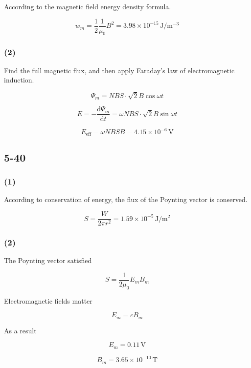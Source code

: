 \documentclass[a4paper,11pt]{amsart}
\theoremstyle{definition}
\begin{document}
	According to the magnetic field energy density formula.
	
	$$
	w_m=\frac{1}{2}\frac{1}{\mu _0}B^2=3.98\times 10^{-15}\,\mathrm{J}/\mathrm{m}^{-3}
	$$
	
	\subsubsection*{(2)}
	
	Find the full magnetic flux, and then apply Faraday's law of electromagnetic induction.
	
	$$
	\varPsi _m=NBS\cdot \sqrt{2}B\cos \omega t
	$$
	
	$$
	E=-\frac{\mathrm{d}\varPsi _m}{\mathrm{d}t}=\omega NBS\cdot \sqrt{2}B\sin \omega t
	$$
	
	$$
	E_{\mathrm{eff}}=\omega NBSB=4.15\times 10^{-6}\,\mathrm{V}
	$$
	
	\subsection*{5-40}
	
	\subsubsection*{(1)}
	
	According to conservation of energy, the flux of the Poynting vector is conserved.
	
	$$
	\bar{S}=\frac{W}{2\pi r^2}=1.59\times 10^{-5}\,\mathrm{J}/\mathrm{m}^2
	$$
	
	\subsubsection*{(2)}
	
	The Poynting vector satisfied
	
	$$
	\bar{S}=\frac{1}{2\mu _0}E_mB_m
	$$
	
	Electromagnetic fields matter
	
	$$
	E_m=cB_m
	$$
	
	As a result
	
	$$
	E_m=0.11\,\mathrm{V}
	$$
	
	$$
	B_m=3.65\times 10^{-10}\,\mathrm{T}
	$$
	
\end{document}
